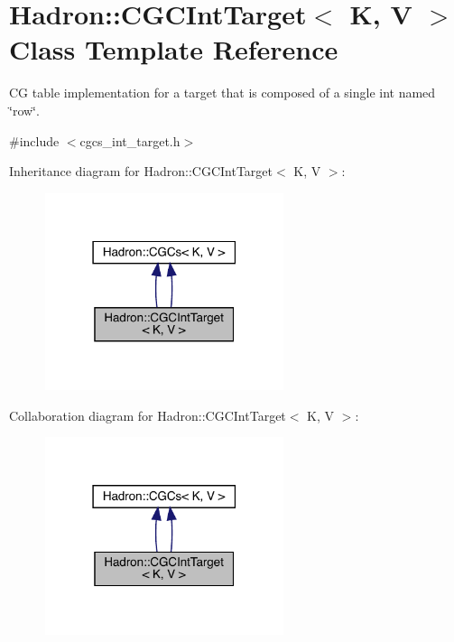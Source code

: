 \hypertarget{classHadron_1_1CGCIntTarget}{}\section{Hadron\+:\+:C\+G\+C\+Int\+Target$<$ K, V $>$ Class Template Reference}
\label{classHadron_1_1CGCIntTarget}


CG table implementation for a target that is composed of a single int named \char`\"{}row\char`\"{}.  




{\ttfamily \#include $<$cgcs\+\_\+int\+\_\+target.\+h$>$}



Inheritance diagram for Hadron\+:\+:C\+G\+C\+Int\+Target$<$ K, V $>$\+:\nopagebreak
\begin{figure}[H]
\begin{center}
\leavevmode
\includegraphics[width=198pt]{de/d3f/classHadron_1_1CGCIntTarget__inherit__graph}
\end{center}
\end{figure}


Collaboration diagram for Hadron\+:\+:C\+G\+C\+Int\+Target$<$ K, V $>$\+:\nopagebreak
\begin{figure}[H]
\begin{center}
\leavevmode
\includegraphics[width=198pt]{d7/d7c/classHadron_1_1CGCIntTarget__coll__graph}
\end{center}
\end{figure}
